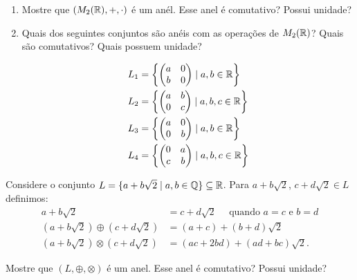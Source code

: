 \documentclass[12pt]{exam}
\begin{document}
    \begin{enumerate}[label=({\alph*})]
        \item Mostre que $(M_2(\mathbb{R}), + , \cdot)$ \'e um an\'el. Esse anel \'e comutativo? Possui unidade?
        \item Quais dos seguintes conjuntos s\~ao an\'eis com as opera\c{c}\~oes de $M_2(\mathbb{R})$? Quais s\~ao comutativos? Quais possuem unidade?

        \begin{align*}
            L_1 &= \left\{\begin{pmatrix}
                a & 0\\
                b & 0
            \end{pmatrix} \mid a, b \in \mathbb{R}\right\}\\
            L_2 &= \left\{\begin{pmatrix}
                a & b\\
                0 & c
            \end{pmatrix} \mid a, b, c \in \mathbb{R}\right\}\\
            L_3 &= \left\{\begin{pmatrix}
                a & 0\\
                0 & b
            \end{pmatrix} \mid a, b \in \mathbb{R}\right\}\\
            L_4 &= \left\{\begin{pmatrix}
                0 & a\\
                c & b
            \end{pmatrix} \mid a, b, c \in \mathbb{R}\right\}
        \end{align*}
    \end{enumerate}

    \vspace{.4cm}

    \questao{} Considere o conjunto $L = \{ a + b\sqrt{2} \mid a, b \in \mathbb{Q}\} \subseteq \mathbb{R}$. Para $a + b\sqrt{2}$, $c + d\sqrt{2} \in L$ definimos:
    \begin{align*}
        a + b\sqrt{2} &= c + d\sqrt{2} \quad \mbox{ quando } a = c \mbox{ e } b = d\\
        (a + b\sqrt{2}) \oplus (c + d\sqrt{2}) &= (a + c) + (b + d)\sqrt{2}\\
        (a + b\sqrt{2}) \otimes (c + d\sqrt{2}) &= (ac + 2bd) + (ad + bc)\sqrt{2}.
    \end{align*}

    Mostre que $(L, \oplus, \otimes)$ \'e um anel. Esse anel \'e comutativo? Possui unidade?
\end{document}
